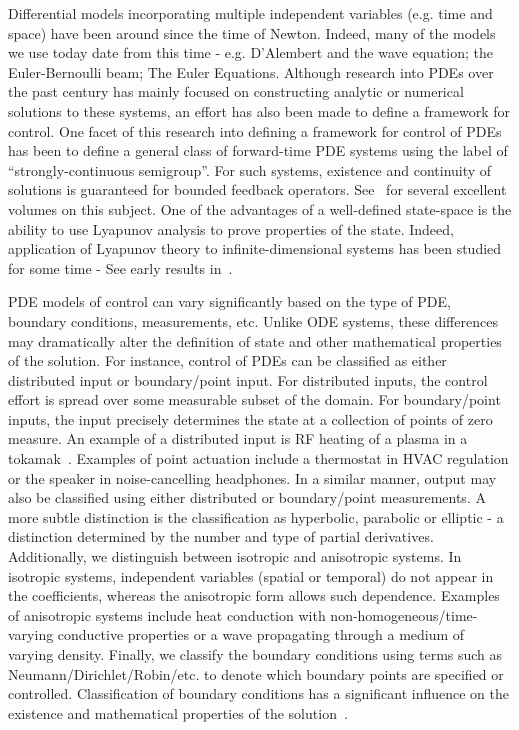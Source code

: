 \documentclass[9pt,journal,twocolumn]{IEEEtran}
\begin{document}
Differential models incorporating multiple independent variables (e.g. time and space) have been around since the time of Newton. Indeed, many of the models we use today date from this time - e.g. D'Alembert and the wave equation; the Euler-Bernoulli beam; The Euler Equations. Although research into PDEs over the past century has mainly focused on constructing analytic or numerical solutions to these systems, an effort has also been made to define a framework for control. One facet of this research into defining a framework for control of PDEs has been to define a general class of forward-time PDE systems using the label of ``strongly-continuous semigroup''. For such systems, existence and continuity of solutions is guaranteed for bounded feedback operators. See~\cite{curtain1995introduction,bensoussan1995representation,
hale1971functional,lasiecka2000control} for several excellent volumes on this subject.
One of the advantages of a well-defined state-space is the ability to use Lyapunov analysis to prove properties of the state. Indeed, application of Lyapunov theory to infinite-dimensional systems has been studied for some time - See early results in~\cite{krasovskistability,datko1970extending,baker1969lyapunov}.


PDE models of control can vary significantly based on the type of PDE, boundary conditions, measurements, etc. Unlike ODE systems, these differences may dramatically alter the definition of state and other mathematical properties of the solution. For instance, control of PDEs can be classified as either distributed input or boundary/point input. For distributed inputs, the control effort is spread over some measurable subset of the domain. For boundary/point inputs, the input precisely determines the state at a collection of points of zero measure. An example of a distributed input is RF heating of a plasma in a tokamak~\cite{bribiesca2011strict}.  Examples of point actuation include a thermostat in HVAC regulation or the speaker in noise-cancelling headphones. In a similar manner, output may also be classified using either distributed or boundary/point measurements. A more subtle distinction is the classification as hyperbolic, parabolic or elliptic - a distinction determined by the number and type of partial derivatives. Additionally, we distinguish between isotropic and anisotropic systems. In isotropic systems, independent variables (spatial or temporal) do not appear in the coefficients, whereas the anisotropic form allows such dependence. Examples of anisotropic systems include heat conduction with non-homogeneous/time-varying conductive properties or a wave propagating through a medium of varying density. Finally, we classify the boundary conditions using terms such as Neumann/Dirichlet/Robin/etc. to denote which boundary points are specified or controlled. Classification of boundary conditions has a significant influence on the existence and mathematical properties of the solution~\cite{lions1972non}.
\end{document}
